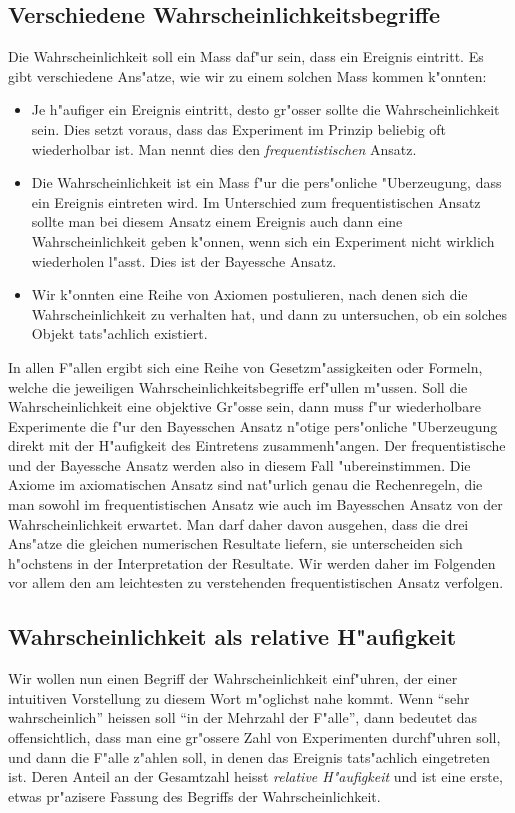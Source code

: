 \subsection{Verschiedene Wahrscheinlichkeitsbegriffe}
Die Wahrscheinlichkeit soll ein Mass daf"ur sein, dass ein Ereignis
eintritt.
Es gibt verschiedene Ans"atze, wie wir zu einem solchen Mass kommen
k"onnten:
\begin{itemize}
\item 
Je h"aufiger ein Ereignis eintritt, desto gr"osser sollte die
Wahrscheinlichkeit sein.
Dies setzt voraus, dass das Experiment im Prinzip beliebig oft wiederholbar 
ist.
Man nennt dies den {\em frequentistischen} Ansatz.
\item
Die Wahrscheinlichkeit ist ein Mass f"ur die pers"onliche
"Uberzeugung, dass ein Ereignis eintreten wird.
Im Unterschied zum frequentistischen Ansatz sollte man bei diesem
Ansatz einem Ereignis auch dann eine Wahrscheinlichkeit geben k"onnen,
wenn sich ein Experiment nicht wirklich wiederholen l"asst.
Dies ist der Bayessche Ansatz.
\item
Wir k"onnten eine Reihe von Axiomen postulieren, nach denen sich
die Wahrscheinlichkeit zu verhalten hat, und dann zu untersuchen,
ob ein solches Objekt tats"achlich existiert.
\end{itemize}
In allen F"allen ergibt sich eine Reihe von Gesetzm"assigkeiten
oder Formeln, welche die jeweiligen Wahrscheinlichkeitsbegriffe 
erf"ullen m"ussen.
Soll die Wahrscheinlichkeit eine objektive Gr"osse sein, dann
muss f"ur wiederholbare Experimente die f"ur den Bayesschen
Ansatz n"otige pers"onliche "Uberzeugung direkt mit der H"aufigkeit
des Eintretens zusammenh"angen.
Der frequentistische und der Bayessche Ansatz werden also in diesem
Fall "ubereinstimmen.
Die Axiome im axiomatischen Ansatz sind nat"urlich genau die
Rechenregeln, die man sowohl im frequentistischen Ansatz wie
auch im Bayesschen Ansatz von der Wahrscheinlichkeit erwartet.
Man darf daher davon ausgehen, dass die drei Ans"atze die gleichen numerischen
Resultate liefern, sie unterscheiden sich h"ochstens in der Interpretation
der Resultate.
Wir werden daher im Folgenden vor allem den am leichtesten zu
verstehenden frequentistischen Ansatz verfolgen.

\subsection{Wahrscheinlichkeit als relative H"aufigkeit}
Wir wollen nun einen Begriff der Wahrscheinlichkeit einf"uhren, der
einer intuitiven Vorstellung zu diesem Wort m"oglichst nahe kommt.
Wenn ``sehr
wahrscheinlich'' heissen soll ``in der Mehrzahl der F"alle'', dann
bedeutet das offensichtlich, dass man eine gr"ossere Zahl von
Experimenten durchf"uhren soll, und dann die F"alle z"ahlen soll,
in denen das Ereignis tats"achlich eingetreten ist.
Deren Anteil
an der Gesamtzahl heisst {\em relative H"aufigkeit} und ist eine erste,
etwas pr"azisere Fassung des Begriffs der Wahrscheinlichkeit.


